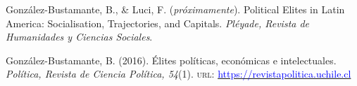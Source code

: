 





\begin{publications}

\begin{benumerate}{2}

\item{\small Gonz\'alez-Bustamante, B., \& Luci, F. ({\itshape próximamente}). Political Elites in Latin America: Socialisation, Trajectories, and Capitals. {\itshape Pléyade, Revista de Humanidades y Ciencias Sociales}.}\vspace{1mm}

\item{\small Gonz\'alez-Bustamante, B. (2016). Élites políticas, económicas e intelectuales. {\itshape Pol\'itica, Revista de Ciencia Pol\'itica, 54}(1). {\scshape url}: \href{https://revistapolitica.uchile.cl/index.php/RP/issue/view/4365}{\textcolor{blue}{https://revistapolitica.uchile.cl}}}\vspace{1mm}

\end{benumerate}

\end{publications}
